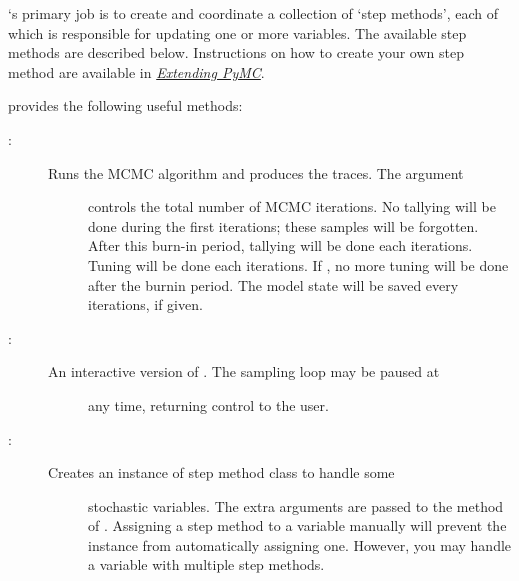\documentclass[letterpaper,10pt,english]{sphinxmanual}
\begin{document}
`s primary job is to create and coordinate a collection of `step methods', each of which is responsible for updating one or more variables. The available step methods are described below. Instructions on how to create your own step method are available in {\hyperref[extending:chap-extending]{\emph{Extending PyMC}}}.

 provides the following useful methods:
\begin{description}
\item[{:}] \leavevmode\begin{description}
\item[{Runs the MCMC algorithm and produces the traces. The  argument}] \leavevmode
controls the total number of MCMC iterations. No tallying will be done
during the first  iterations; these samples will be forgotten.
After this burn-in period, tallying will be done each  iterations.
Tuning will be done each  iterations. If
, no more tuning will be done after the burnin
period. The model state will be saved every  iterations,
if given.

\end{description}

\item[{:}] \leavevmode\begin{description}
\item[{An interactive version of . The sampling loop may be paused at}] \leavevmode
any time, returning control to the user.

\end{description}

\item[{:}] \leavevmode\begin{description}
\item[{Creates an instance of step method class  to handle some}] \leavevmode
stochastic variables. The extra arguments are passed to the  method
of . Assigning a step method to a variable manually will prevent
the  instance from automatically assigning one. However, you may
handle a variable with multiple step methods.

\end{description}


\end{description}
\end{document}
